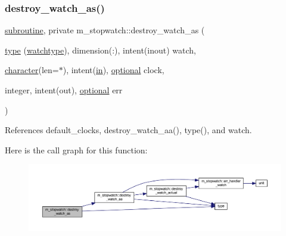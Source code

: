 \subsubsection{\texorpdfstring{destroy\+\_\+watch\+\_\+as()}{destroy\_watch\_as()}}
{\footnotesize\ttfamily \hyperlink{M__stopwatch_83_8txt_acfbcff50169d691ff02d4a123ed70482}{subroutine}, private m\+\_\+stopwatch\+::destroy\+\_\+watch\+\_\+as (\begin{DoxyParamCaption}\item[{\hyperlink{stop__watch_83_8txt_a70f0ead91c32e25323c03265aa302c1c}{type} (\hyperlink{structm__stopwatch_1_1watchtype}{watchtype}), dimension(\+:), intent(inout)}]{watch,  }\item[{\hyperlink{option__stopwatch_83_8txt_abd4b21fbbd175834027b5224bfe97e66}{character}(len=$\ast$), intent(\hyperlink{M__journal_83_8txt_afce72651d1eed785a2132bee863b2f38}{in}), \hyperlink{option__stopwatch_83_8txt_aa4ece75e7acf58a4843f70fe18c3ade5}{optional}}]{clock,  }\item[{integer, intent(out), \hyperlink{option__stopwatch_83_8txt_aa4ece75e7acf58a4843f70fe18c3ade5}{optional}}]{err }\end{DoxyParamCaption})\hspace{0.3cm}{\ttfamily [private]}}



References default\+\_\+clocks, destroy\+\_\+watch\+\_\+aa(), type(), and watch.

Here is the call graph for this function\+:
\nopagebreak
\begin{figure}[H]
\begin{center}
\leavevmode
\includegraphics[width=350pt]{namespacem__stopwatch_a96a4051d4baf7bd447bc16c0b47983d4_cgraph}
\end{center}
\end{figure}
\mbox{\label{namespacem__stopwatch_a56c7eb5332f1d56b46bfc9a3a9b10134}} 
